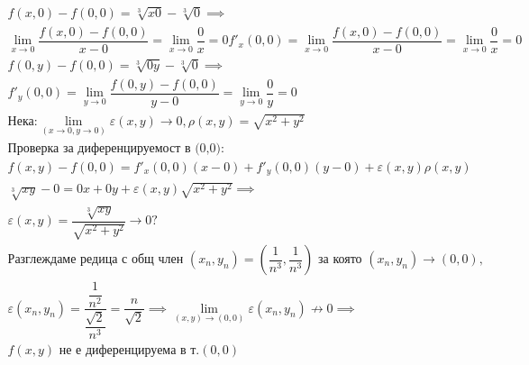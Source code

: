 \documentclass[a4paper,fleqn,12pt]{article}
\theoremstyle{definition}
\begin{document}
\begin{gather*}
f(x,0) - f(0,0) = \sqrt[3]{x0} - \sqrt[3]{0}\implies \\
\lim\limits_{x \to 0} \dfrac{f(x,0) - f(0,0)}{x - 0} = \lim\limits_{x \to 0} \dfrac{0}{x} = 0
f'_x(0,0) = \lim\limits_{x \to 0} \dfrac{f(x,0) - f(0,0)}{x - 0} =  \lim\limits_{x \to 0} \dfrac{0}{x} = 0\\
f(0,y) - f(0,0) = \sqrt[3]{0y} - \sqrt[3]{0} \implies \\
f'_y(0,0) = \lim\limits_{y \to 0} \dfrac{f(0,y) - f(0,0)}{y - 0} =  \lim\limits_{y \to 0} \dfrac{0}{y} = 0\\
\text{Нека:}
\lim\limits_ {(x \to 0, y \to 0)} \varepsilon (x,y) \to 0, \rho (x,y) = \sqrt{x^2 + y^2}\\
\text{Проверка за диференцируемост в (0,0):}\\
 f(x,y) - f(0,0)  = f'_x(0,0)(x - 0) + f'_y(0,0)(y-0) + \varepsilon (x,y) \rho (x,y) \\
\sqrt[3]{xy} - 0 = 0x + 0y + \varepsilon (x,y)\sqrt{x^2 + y^2} \implies \\
\varepsilon (x,y) = \dfrac{\sqrt[3]{xy}}{\sqrt{x^2 + y^2}} \to 0? \\
\text{Разглеждаме редица с общ член } (x_n, y_n) = \left( \dfrac{1}{n^3}, \dfrac{1}{n^3} \right) \text{ за която } (x_n, y_n) \to (0,0), \\
\varepsilon (x_n, y_n) = \dfrac{\dfrac{1}{n^2}}{\dfrac{\sqrt{2}}{n^3}} = \dfrac{n}{\sqrt{2}} \implies
\lim\limits_ {(x,y) \to (0,0)}\varepsilon(x_n, y_n) \not\to 0 \implies \\
 f(x,y) \text{ не е диференцируема в т.} (0,0)
\end{gather*}
\end{document}

